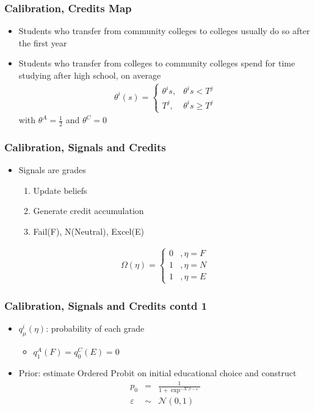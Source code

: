\begin{frame}
	\frametitle{Calibration, Credits Map}
		\begin{itemize}
		\item Students who transfer from community colleges to colleges usually do so after the first year
		\item Students who transfer from colleges to community colleges spend for time studying after high school, on average
			\begin{eqnarray}
				\theta^i(s) =
				\begin{cases}
					\theta^i s ,& \theta^i s < T^j \\
					T^j        ,& \theta^i s \geq T^j
				\end{cases}
			\end{eqnarray}
\noindent with $\theta^A = \frac{1}{2}$ and $\theta^C = 0$
		\end{itemize}
\end{frame}

\begin{frame}
	\frametitle{Calibration, Signals and Credits}
		\begin{itemize}
		\item Signals are grades
			\begin{enumerate}
				\item Update beliefs
				\item Generate credit accumulation
				\item Fail(F), N(Neutral), Excel(E)
			\end{enumerate}
		\begin{eqnarray}
			\Omega(\eta) =
				\begin{cases}
					0 &, \eta = F \\
					1 &, \eta = N \\
					1 &, \eta = E
				\end{cases}
		\end{eqnarray}			
	\end{itemize}		
\end{frame}

\begin{frame}
	\frametitle{Calibration, Signals and Credits contd 1}
		\begin{itemize}
			\item $q_{\mu}^i(\eta)$: probability of each grade
				\begin{itemize}
					\item $q_{1}^A(F) = q_{0}^C(E) = 0$	
				\end{itemize}	
			\item Prior: estimate Ordered Probit on initial educational choice and construct
				\begin{eqnarray}
				p_{0} &=& \frac{1}{1 + \exp^{- X'\beta - \varepsilon}} \nonumber \\
				\varepsilon &\sim& \mathcal{N}(0,1) 
				\end{eqnarray}						 
		\end{itemize}
\end{frame}


